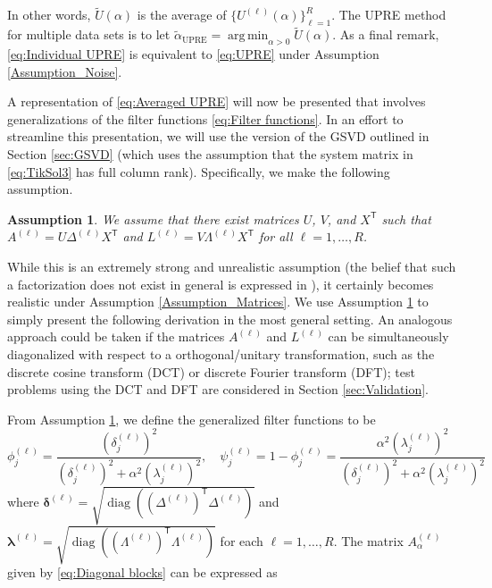\documentclass[12pt]{article}
\newcommand{\trans}[1]{{#1}^\mathsf{T}}	%
\DeclareMathOperator{\diag}{diag}	%
\newcommand{\regparam}{\alpha}  %
\DeclareMathOperator*{\argmin}{arg\,min}
\newcommand{\filt}{\phi}
\newcommand{\mfilt}{\psi}
\newcommand{\A}{A_{\regparam}}	%
\newcommand{\U}{U}	%
\newtheorem{assumption}{Assumption}
\begin{document}
\noindent In other words, $\widetilde{\U}(\regparam)$ is the average of $\{\U^{(\ell)}(\regparam)\}_{\ell=1}^R$. The UPRE method for multiple data sets is to let $\widetilde{\regparam}_{\textrm{UPRE}} = \argmin_{\regparam > 0} \widetilde{\U}(\regparam)$. As a final remark, \eqref{eq:Individual UPRE} is equivalent to \eqref{eq:UPRE} under Assumption \ref{Assumption_Noise}. \par
A representation of \eqref{eq:Averaged UPRE} will now be presented that involves generalizations of the filter functions \eqref{eq:Filter functions}. In an effort to streamline this presentation, we will use the version of the GSVD outlined in Section \ref{sec:GSVD} (which uses the assumption that the system matrix in \eqref{eq:TikSol3} has full column rank). Specifically, we make the following assumption.
\begin{assumption}
\label{Assumption_Diagonalization}
We assume that there exist matrices $U$, $V$, and $\trans{X}$ such that $A^{(\ell)} = U{\Delta^{(\ell)}}\trans{X}$ and  $L^{(\ell)} = V{\Lambda^{(\ell)}}\trans{X}$ for all $\ell = 1,\ldots,R$. 
\end{assumption}
\noindent While this is an extremely strong and unrealistic assumption (the belief that such a factorization does not exist in general is expressed in \cite{Brezinski2003}), it certainly becomes realistic under Assumption \ref{Assumption_Matrices}. We use Assumption \ref{Assumption_Diagonalization} to simply present the following derivation in the most general setting. An analogous approach could be taken if the matrices $A^{(\ell)}$ and $L^{(\ell)}$ can be simultaneously diagonalized with respect to a orthogonal/unitary transformation, such as the discrete cosine transform (DCT) or discrete Fourier transform (DFT); test problems using the DCT and DFT are considered in Section \ref{sec:Validation}. \par
From Assumption \ref{Assumption_Diagonalization}, we define the generalized filter functions to be
\begin{equation}
\label{eq:Filter functions 2}
\filt^{(\ell)}_j = \frac{\left(\delta^{(\ell)}_j\right)^2}{\left(\delta^{(\ell)}_j\right)^2 + \regparam^2 \left(\lambda^{(\ell)}_j\right)^2}, \quad \mfilt^{(\ell)}_j = 1 - \filt^{(\ell)}_j = \frac{\regparam^2 \left(\lambda^{(\ell)}_j\right)^2}{\left(\delta^{(\ell)}_j\right)^2 + \regparam^2 \left(\lambda^{(\ell)}_j\right)^2}
\end{equation}
where $\bm{\delta}^{(\ell)} = \sqrt{\diag(\trans{(\Delta^{(\ell)})}\Delta^{(\ell)})}$ and $\bm{\lambda}^{(\ell)} = \sqrt{\diag(\trans{(\Lambda^{(\ell)})}\Lambda^{(\ell)})}$ for each $\ell = 1,\ldots,R$. The matrix $\A^{(\ell)}$ given by \eqref{eq:Diagonal blocks} can be expressed as
\end{document}
